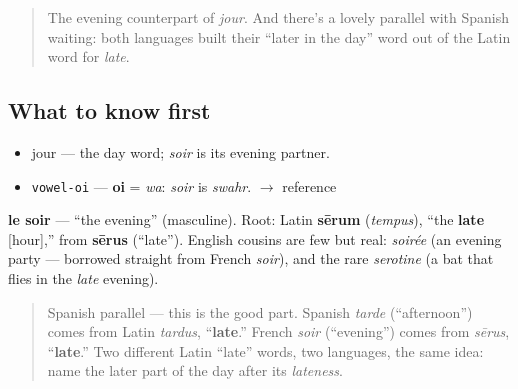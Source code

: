 \label{lesson:FR-C01-soir}



\begin{quote}
The evening counterpart of \emph{jour}. And there's a lovely parallel with Spanish waiting: both languages built their \textquotedblleft{}later in the day\textquotedblright{} word out of the Latin word for \emph{late}.
\end{quote}

\subsection*{What to know first}
\begin{itemize}
\raggedright
  \item jour — the day word; \emph{soir} is its evening partner.
\end{itemize}

\begin{sounds}
\begin{itemize}
\raggedright
  \item \texttt{vowel-oi} — \textbf{oi} = \emph{wa}: \emph{soir} is \emph{swahr}. $\to$ reference
\end{itemize}
\end{sounds}

\begin{cousinweb}
\textbf{le soir} — \textquotedblleft{}the evening\textquotedblright{} (masculine). Root: Latin \textbf{sērum} (\emph{tempus}), \textquotedblleft{}the \textbf{late} {[}hour{]},\textquotedblright{} from \textbf{sērus} (\textquotedblleft{}late\textquotedblright{}). English cousins are few but real: \emph{soirée} (an evening party — borrowed straight from French \emph{soir}), and the rare \emph{serotine} (a bat that flies in the \emph{late} evening).

\begin{quote}
Spanish parallel — this is the good part. Spanish \emph{tarde} (\textquotedblleft{}afternoon\textquotedblright{}) comes from Latin \emph{tardus}, \textquotedblleft{}\textbf{late}.\textquotedblright{} French \emph{soir} (\textquotedblleft{}evening\textquotedblright{}) comes from \emph{sērus}, \textquotedblleft{}\textbf{late}.\textquotedblright{} Two different Latin \textquotedblleft{}late\textquotedblright{} words, two languages, the same idea: name the later part of the day after its \emph{lateness}.
\end{quote}
\end{cousinweb}

